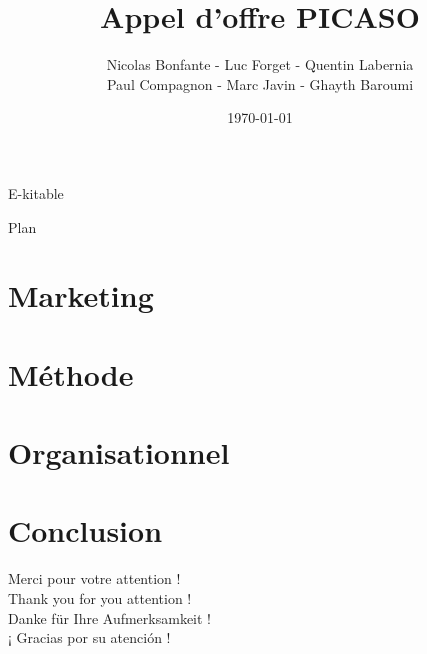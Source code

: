 \documentclass{beamer}
\title{Appel d'offre PICASO}
\author{Nicolas Bonfante - Luc Forget - Quentin Labernia \\ Paul Compagnon - Marc Javin - Ghayth Baroumi}
\institute{INSA Lyon}
\date{\today}
\begin{document}
\begin{frame}
\begin{center}
\huge E-kitable
\end{center}
\maketitle
\end{frame}

\begin{frame}{Plan}
  \tableofcontents
\end{frame}

\section{Marketing}



\section{Méthode}



\section{Organisationnel}



\section{Conclusion}
\begin{frame}
\begin{center}
Merci pour votre attention ! \\
\vspace{1cm}
Thank you for you attention ! \\
\vspace{1cm}
Danke für Ihre Aufmerksamkeit ! \\
\vspace{1cm}
¡ Gracias por su atención ! \\
\end{center}
\end{frame}
\end{document}
